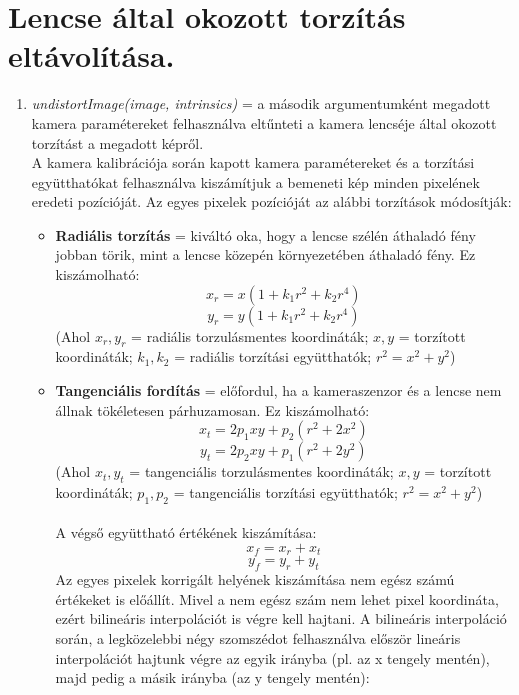 \documentclass[12pt]{report}
\begin{document}
        \section{Lencse által okozott torzítás eltávolítása.}
            \begin{enumerate}
                \item \textit{undistortImage(image, intrinsics)} = a második argumentumként megadott kamera paramétereket felhasználva eltűnteti a kamera lencséje által okozott torzítást a megadott képről.\\
                      A kamera kalibrációja során kapott kamera paramétereket és a torzítási együtthatókat felhasználva kiszámítjuk a bemeneti kép minden pixelének eredeti pozícióját. Az egyes pixelek pozícióját az alábbi torzítások módosítják:
                        \begin{itemize}
                            \item \textbf{Radiális torzítás} = kiváltó oka, hogy a lencse szélén áthaladó fény jobban törik, mint a lencse közepén környezetében áthaladó fény. Ez kiszámolható:\\
                                \[x_r = x(1 + k_1r^2 + k_2r^4)\]
                                \[y_r = y(1 + k_1r^2 + k_2r^4)\]
                                (Ahol $x_r, y_r$ = radiális torzulásmentes koordináták; $x, y$ = torzított koordináták; $k_1, k_2$ = radiális torzítási együtthatók; $r^2 = x^2 + y^2$)
                            \item \textbf{Tangenciális fordítás} = előfordul, ha a kameraszenzor és a lencse nem állnak tökéletesen párhuzamosan. Ez kiszámolható:\\
                                \[x_t = 2p_1xy + p_2(r^2+2x^2)\]
                                \[y_t = 2p_2xy + p_1(r^2 + 2y^2)\]
                                (Ahol $x_t, y_t$ = tangenciális torzulásmentes koordináták; $x, y$ = torzított koordináták; $p_1, p_2$ = tangenciális torzítási együtthatók; $r^2 = x^2 + y^2$)\\\\
                                A végső együttható értékének kiszámítása:
                                \[x_f = x_r + x_t\]
                                \[y_f = y_r + y_t\]
                    Az egyes pixelek korrigált helyének kiszámítása nem egész számú értékeket is előállít. Mivel a nem egész szám nem lehet pixel koordináta, ezért bilineáris interpolációt is végre kell hajtani. A bilineáris interpoláció során, a legközelebbi négy szomszédot felhasználva először lineáris interpolációt hajtunk végre az egyik irányba (pl. az x tengely mentén), majd pedig a másik irányba (az y tengely mentén):

\end{itemize}
\end{enumerate}
\end{document}
